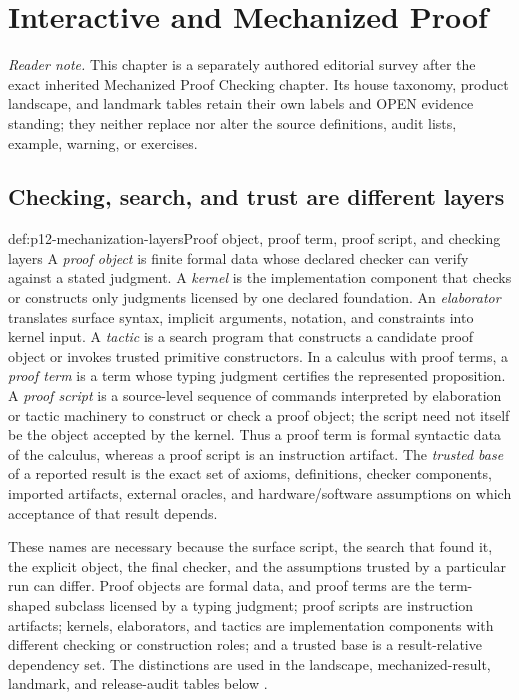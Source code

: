 \chapter{Interactive and Mechanized Proof}
\label{sec:p12-interactive-proof}

\noindent\emph{Reader note.}
This chapter is a separately authored editorial survey after the exact
inherited Mechanized Proof Checking chapter.  Its house taxonomy, product
landscape, and landmark tables retain their own labels and OPEN evidence
standing; they neither replace nor alter the source definitions, audit lists,
example, warning, or exercises.

\section{Checking, search, and trust are different layers}

\begin{hbdefinition}{def:p12-mechanization-layers}{Proof object, proof term, proof script, and checking layers}
A \emph{proof object} is finite formal data whose declared checker can verify
against a stated judgment.  A \emph{kernel} is the implementation component
that checks or constructs only judgments licensed by one declared foundation.
An \emph{elaborator} translates surface syntax, implicit arguments, notation,
and constraints into kernel input.  A \emph{tactic} is a search program that
constructs a candidate proof object or invokes trusted primitive constructors.
In a calculus with proof terms, a \emph{proof term} is a term whose typing
judgment certifies the represented proposition.  A \emph{proof script} is a
source-level sequence of commands interpreted by elaboration or tactic
machinery to construct or check a proof object; the script need not itself be
the object accepted by the kernel.  Thus a proof term is formal syntactic data
of the calculus, whereas a proof script is an instruction artifact.
The \emph{trusted base} of a reported result is the exact set of axioms,
definitions, checker components, imported artifacts, external oracles, and
hardware/software assumptions on which acceptance of that result depends.

These names are necessary because the surface script, the search that found
it, the explicit object, the final checker, and the assumptions trusted by a
particular run can differ.  Proof objects are formal data, and proof terms are
the term-shaped subclass licensed by a typing judgment; proof scripts are
instruction artifacts; kernels, elaborators, and tactics are implementation
components with different checking or construction roles; and a trusted base
is a result-relative dependency set.  The distinctions are used in the
landscape, mechanized-result, landmark, and release-audit tables below
\cite{Harrison2009,Pollack1998}.
\end{hbdefinition}

